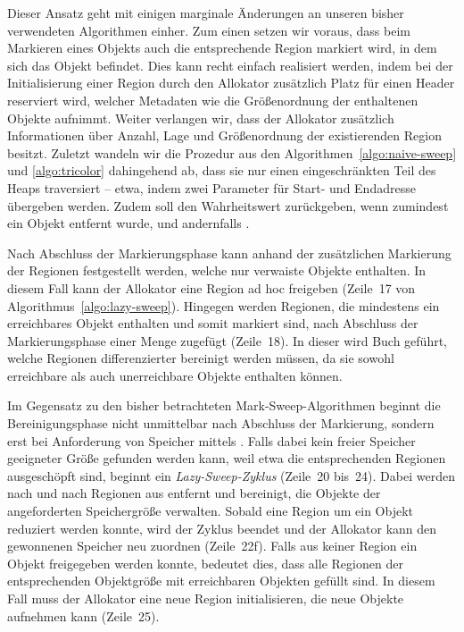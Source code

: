 Dieser Ansatz geht mit einigen marginale Änderungen an unseren bisher verwendeten Algorithmen einher.
Zum einen setzen wir voraus, dass beim Markieren eines Objekts auch die entsprechende Region markiert wird, in dem sich das Objekt befindet.
Dies kann recht einfach realisiert werden, indem bei der Initialisierung einer Region durch den Allokator zusätzlich Platz für einen Header reserviert wird, welcher Metadaten wie die Größenordnung der enthaltenen Objekte aufnimmt.
Weiter verlangen wir, dass der Allokator zusätzlich Informationen über Anzahl, Lage und Größenordnung der existierenden Region besitzt.
Zuletzt wandeln wir die Prozedur  aus den Algorithmen~\ref{algo:naive-sweep} und \ref{algo:tricolor} dahingehend ab, dass sie nur einen eingeschränkten Teil des Heaps traversiert -- etwa, indem zwei Parameter für Start- und Endadresse übergeben werden.
Zudem soll  den Wahrheitswert  zurückgeben, wenn zumindest ein Objekt entfernt wurde, und andernfalls .

Nach Abschluss der Markierungsphase kann anhand der zusätzlichen Markierung der Regionen festgestellt werden, welche nur verwaiste Objekte enthalten.
In diesem Fall kann der Allokator eine Region ad hoc freigeben (Zeile~17 von Algorithmus~\ref{algo:lazy-sweep}).
Hingegen werden Regionen, die mindestens ein erreichbares Objekt enthalten und somit markiert sind, nach Abschluss der Markierungsphase einer Menge  zugefügt (Zeile~18).
In dieser wird Buch geführt, welche Regionen differenzierter bereinigt werden müssen, da sie sowohl erreichbare als auch unerreichbare Objekte enthalten können.

Im Gegensatz zu den bisher betrachteten Mark-Sweep-Algorithmen beginnt die Bereinigungsphase nicht unmittelbar nach Abschluss der Markierung, sondern erst bei Anforderung von Speicher mittels .
Falls dabei kein freier Speicher geeigneter Größe gefunden werden kann, weil etwa die entsprechenden Regionen ausgeschöpft sind, beginnt ein \textit{Lazy-Sweep-Zyklus} (Zeile~20 bis~24).
Dabei werden nach und nach Regionen aus  entfernt und bereinigt, die Objekte der angeforderten Speichergröße verwalten.
Sobald eine Region um ein Objekt reduziert werden konnte, wird der Zyklus beendet und der Allokator kann den gewonnenen Speicher neu zuordnen (Zeile~22f).
Falls aus keiner Region ein Objekt freigegeben werden konnte, bedeutet dies, dass alle Regionen der entsprechenden Objektgröße mit erreichbaren Objekten gefüllt sind.
In diesem Fall muss der Allokator eine neue Region initialisieren, die neue Objekte aufnehmen kann (Zeile~25).

